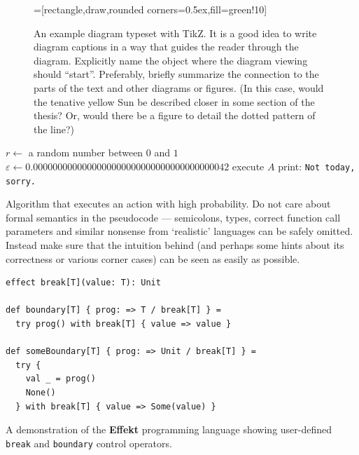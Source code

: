 \begin{figure}
\centering
{}=[rectangle,draw,rounded corners=0.5ex,fill=green!10]
\caption{An example diagram typeset with TikZ. It is a good idea to write diagram captions in a way that guides the reader through the diagram. Explicitly name the object where the diagram viewing should ``start''. Preferably, briefly summarize the connection to the parts of the text and other diagrams or figures. (In this case, would the tenative yellow Sun be described closer in some section of the thesis? Or, would there be a figure to detail the dotted pattern of the line?)}
\label{fig:schema}
\end{figure}

\begin{algorithm}
\begin{algorithmic}
	\State $r \gets$ a random number between $0$ and $1$
	\State $\varepsilon \gets 0.0000000000000000000000000000000000000042$
		\State execute $A$ 
	\Else
		\State print: \texttt{Not today, sorry.}
	\EndIf
\EndFunction
\end{algorithmic}
\caption{Algorithm that executes an action with high probability. Do not care about formal semantics in the pseudocode --- semicolons, types, correct function call parameters and similar nonsense from `realistic' languages can be safely omitted. Instead make sure that the intuition behind (and perhaps some hints about its correctness or various corner cases) can be seen as easily as possible.}
\label{alg:w}
\end{algorithm}

\begin{listing}
\begin{lstlisting}[language=Effekt]
effect break[T](value: T): Unit

def boundary[T] { prog: => T / break[T] } =
  try prog() with break[T] { value => value }

def someBoundary[T] { prog: => Unit / break[T] } =
  try {
    val _ = prog()
    None()
  } with break[T] { value => Some(value) }
\end{lstlisting}
\caption{A demonstration of the \textbf{Effekt} programming language showing user-defined \texttt{break} and \texttt{boundary} control operators.}
\label{lst:break}
\end{listing}

